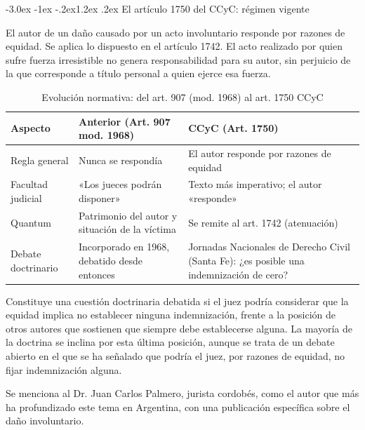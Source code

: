 \documentclass[12pt,oneside]{book}
\makeatletter
\renewcommand\section{\@startsection{section}{1}{\z@}%
  {-3.0ex \@plus -1ex \@minus -.2ex}{1.2ex \@plus .2ex}%
  {\normalfont\large\bfseries\color{acento}}}
\makeatother
\begin{document}
\section{El artículo 1750 del CCyC: régimen vigente}

\begin{definicion}
El autor de un daño causado por un acto involuntario responde por razones de equidad. Se aplica lo dispuesto en el artículo 1742. El acto realizado por quien sufre fuerza irresistible no genera responsabilidad para su autor, sin perjuicio de la que corresponde a título personal a quien ejerce esa fuerza.
\end{definicion}

\begin{table}[H]
\centering
\caption{Evolución normativa: del art. 907 (mod. 1968) al art. 1750 CCyC}
\begin{tabularx}{\textwidth}{l X X}
\toprule
\textbf{Aspecto} & \textbf{Anterior (Art. 907 mod. 1968)} & \textbf{CCyC (Art. 1750)} \\
\midrule
Regla general & Nunca se respondía & El autor responde por razones de equidad \\
Facultad judicial & «Los jueces podrán disponer» & Texto más imperativo; el autor «responde» \\
Quantum & Patrimonio del autor y situación de la víctima & Se remite al art. 1742 (atenuación) \\
Debate doctrinario & Incorporado en 1968, debatido desde entonces & Jornadas Nacionales de Derecho Civil (Santa Fe): ¿es posible una indemnización de cero? \\
\bottomrule
\end{tabularx}
\end{table}

\begin{nota}
Constituye una cuestión doctrinaria debatida si el juez podría considerar que la equidad implica no establecer ninguna indemnización, frente a la posición de otros autores que sostienen que siempre debe establecerse alguna. La mayoría de la doctrina se inclina por esta última posición, aunque se trata de un debate abierto en el que se ha señalado que podría el juez, por razones de equidad, no fijar indemnización alguna.

Se menciona al Dr. Juan Carlos Palmero, jurista cordobés, como el autor que más ha profundizado este tema en Argentina, con una publicación específica sobre el daño involuntario.
\end{nota}
\end{document}
